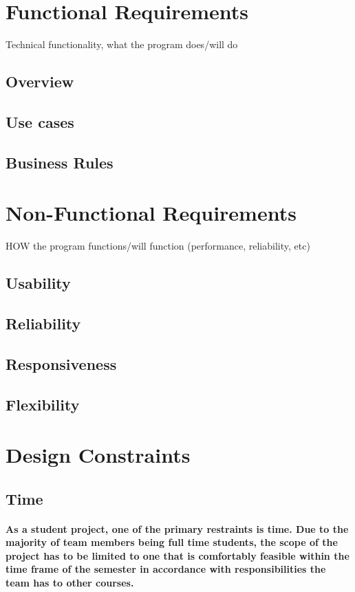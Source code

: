 \documentclass{article}
\begin{document}
\newpage
\section {Functional Requirements}
Technical functionality, what the program does/will do

\subsection{Overview}
\subsection{Use cases}
\subsection{Business Rules}

\newpage
\section {Non-Functional Requirements}
HOW the program functions/will function (performance, reliability, etc)

\subsection{Usability}
\subsection{Reliability}
\subsection{Responsiveness}
\subsection{Flexibility}

\newpage
\section {Design Constraints}

\subsection{Time}
\paragraph{ \indent As a student project, one of the primary restraints is time. Due to the majority of team members being full time students, the scope of the project has to be limited to one that is comfortably feasible within the time frame of the semester in accordance with responsibilities the team has to other courses.}
\end{document}
